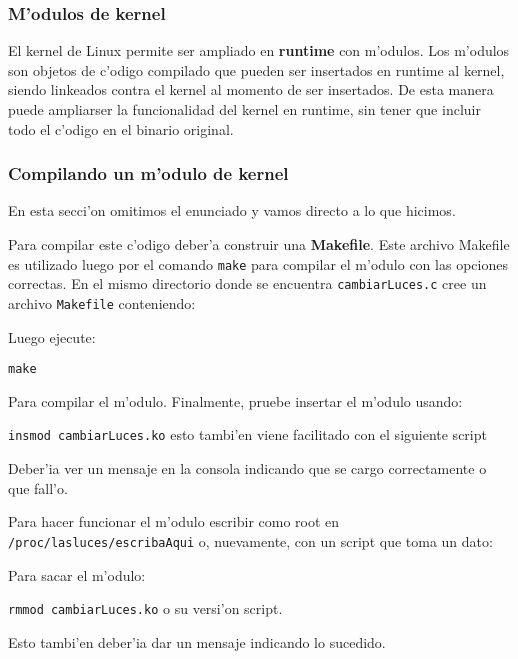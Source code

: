 \subsubsection{M'odulos de kernel}

El kernel de Linux permite ser ampliado en \textbf{runtime} con m'odulos. Los m'odulos son objetos de c'odigo compilado
que pueden ser insertados en runtime al kernel, siendo linkeados contra el kernel al momento de ser insertados. De esta
manera puede ampliarser la funcionalidad del kernel en runtime, sin tener que incluir todo el c'odigo en el binario
original.

\subsubsection{Compilando un m'odulo de kernel}

En esta secci'on omitimos el enunciado y vamos directo a lo que hicimos.


Para compilar este c'odigo deber'a construir una \textbf{Makefile}. Este archivo Makefile es utilizado luego por el
comando \texttt{make} para compilar el m'odulo con las opciones correctas. En el mismo directorio donde se encuentra
\texttt{cambiarLuces.c} cree un archivo \texttt{Makefile} conteniendo:


Luego ejecute:

\texttt{make}

Para compilar el m'odulo. Finalmente, pruebe insertar el m'odulo usando:

\texttt{insmod cambiarLuces.ko} esto tambi'en viene facilitado con el siguiente script

Deber'ia ver un mensaje en la consola indicando que se cargo correctamente o que fall'o.

Para hacer funcionar el m'odulo escribir como root en \texttt{/proc/lasluces/escribaAqui} o, nuevamente, con un script que toma un dato:


Para sacar el m'odulo:

\texttt{rmmod cambiarLuces.ko} o su versi'on script.


Esto tambi'en deber'ia dar un mensaje indicando lo sucedido.

